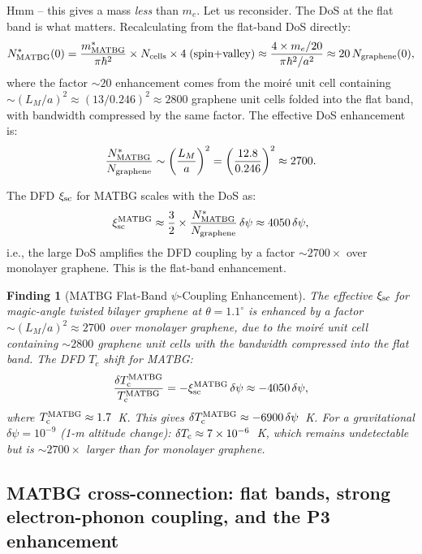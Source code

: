 \documentclass[11pt]{article}
\newtheorem{finding}{Finding}
\newcommand{\ee}[1]{\times 10^{#1}}
\newcommand{\Tc}{T_{\rm c}}
\begin{document}
Hmm -- this gives a mass \emph{less} than $m_e$. Let us reconsider. The DoS at the
flat band is what matters. Recalculating from the flat-band DoS directly:
\begin{equation}
N^*_{\rm MATBG}(0) = \frac{m^*_{\rm MATBG}}{\pi\hbar^2}
\times N_{\rm cells}\times 4\;(\text{spin+valley})
\approx \frac{4 \times m_e/20}{\pi\hbar^2/a^2}
\approx 20\,N_{\rm graphene}(0),
\label{eq:DoS-MATBG}
\end{equation}
where the factor $\sim 20$ enhancement comes from the moir\'e unit cell
containing $\sim (L_M/a)^2 \approx (13/0.246)^2 \approx 2800$ graphene
unit cells folded into the flat band, with bandwidth compressed by
the same factor. The effective DoS enhancement is:
\begin{equation}
\frac{N^*_{\rm MATBG}}{N_{\rm graphene}} \sim \left(\frac{L_M}{a}\right)^2
= \left(\frac{12.8}{0.246}\right)^2 \approx 2700.
\label{eq:DoS-enhancement}
\end{equation}

The DFD $\xi_{\rm sc}$ for MATBG scales with the DoS as:
\begin{equation}
\xi_{\rm sc}^{\rm MATBG} \approx \frac{3}{2}
  \times \frac{N^*_{\rm MATBG}}{N_{\rm graphene}}\,\delta\psi
\approx 4050\,\delta\psi,
\label{eq:xi-MATBG}
\end{equation}
i.e., the large DoS amplifies the DFD coupling by a factor
$\sim 2700\times$ over monolayer graphene. This is the flat-band
enhancement.

\begin{finding}[MATBG Flat-Band $\psi$-Coupling Enhancement]
The effective $\xi_{\rm sc}$ for magic-angle twisted bilayer graphene at
$\theta = 1.1^\circ$ is enhanced by a factor $\sim (L_M/a)^2 \approx 2700$
over monolayer graphene, due to the moir\'e unit cell containing $\sim 2800$
graphene unit cells with the bandwidth compressed into the flat band.
The DFD $T_c$ shift for MATBG:
\begin{equation}
\frac{\delta\Tc^{\rm MATBG}}{\Tc^{\rm MATBG}}
= -\xi_{\rm sc}^{\rm MATBG}\,\delta\psi
\approx -4050\,\delta\psi,
\end{equation}
where $\Tc^{\rm MATBG} \approx 1.7$~K. This gives
$\delta\Tc^{\rm MATBG} \approx -6900\,\delta\psi$~K. For
a gravitational $\delta\psi = 10^{-9}$ (1-m altitude change):
$\delta\Tc \approx 7\ee{-6}$~K, which remains undetectable but is
$\sim 2700\times$ larger than for monolayer graphene.
\end{finding}

\subsection{MATBG cross-connection: flat bands, strong electron-phonon coupling,
and the P3 enhancement}
\end{document}
